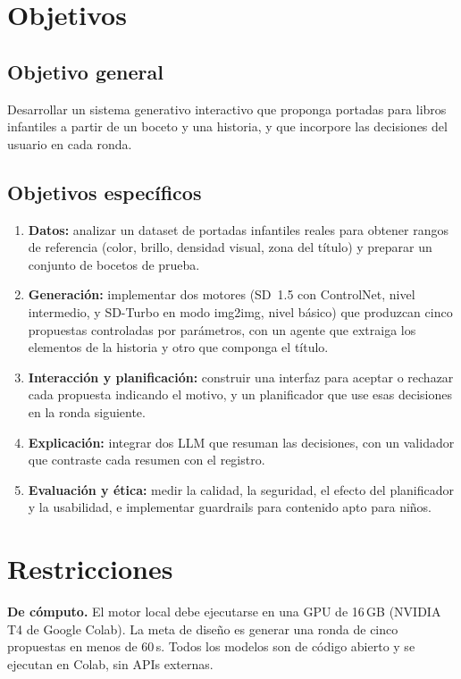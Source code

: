 \documentclass[10pt,a4paper,twocolumn]{article}
\begin{document}
\section{Objetivos}
\subsection{Objetivo general}
Desarrollar un sistema generativo interactivo que proponga portadas para libros infantiles a partir de un boceto y una historia, y que incorpore las decisiones del usuario en cada ronda.

\subsection{Objetivos específicos}
\begin{enumerate}
\item \textbf{Datos:} analizar un dataset de portadas infantiles reales para obtener rangos de referencia (color, brillo, densidad visual, zona del título) y preparar un conjunto de bocetos de prueba.
\item \textbf{Generación:} implementar dos motores (SD~1.5 con ControlNet, nivel intermedio, y SD-Turbo en modo img2img, nivel básico) que produzcan cinco propuestas controladas por parámetros, con un agente que extraiga los elementos de la historia y otro que componga el título.
\item \textbf{Interacción y planificación:} construir una interfaz para aceptar o rechazar cada propuesta indicando el motivo, y un planificador que use esas decisiones en la ronda siguiente.
\item \textbf{Explicación:} integrar dos LLM que resuman las decisiones, con un validador que contraste cada resumen con el registro.
\item \textbf{Evaluación y ética:} medir la calidad, la seguridad, el efecto del planificador y la usabilidad, e implementar guardrails para contenido apto para niños.
\end{enumerate}

\section{Restricciones}
\textbf{De cómputo.} El motor local debe ejecutarse en una GPU de 16\,GB (NVIDIA T4 de Google Colab). La meta de diseño es generar una ronda de cinco propuestas en menos de 60\,s. Todos los modelos son de código abierto y se ejecutan en Colab, sin APIs externas.
\end{document}

